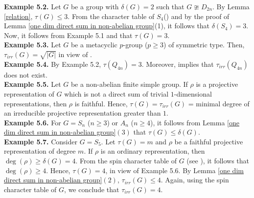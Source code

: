 \documentclass[a4paper,11pt]{amsart}
\numberwithin{equation}{section}
\numberwithin{equation}{subsection}
\newcommand{\dg}{\delta(G)}
\newcommand{\tg}{\tau(G)}
\begin{document}
\textbf{Example 5.2.} \label{tau(G) = 3}
Let $G$ be a group with $\dg= 2$ such that $G \ncong D_{2n}$. By Lemma \ref{relation}, $\tg \leq 3$. From the character table of $S_4$(\cite[18.1]{liebeck}) and by the proof of Lemma \ref{one dim direct sum in non-abelian group}(1), it follows that $\delta(S_4)=3$. Now,  it follows from Example 5.1 and \cite[Examples 2.2, 2.3 and 2.5]{kaur} that $\tg= 3$.  \\

\textbf{Example 5.3.} 
Let $G$ be a metacyclic $p$-group ($p \ge 3$) of symmetric type. Then, $\tau_{irr}(G)= \sqrt{|G|}$ in view of \cite[Chapter 10, Proof of Theorem 4.16]{karpilovsky}.  \\

\textbf{Example 5.4.}  \label{Q4n}
By Example 5.2, $\tau(Q_{4n})=3$. Moreover, \cite[Chapter 10, Theorem 4.14]{karpilovsky} implies that $\tau_{irr}(Q_{4n})$ does not exist.     \\

\textbf{Example 5.5.} \label{simple group}
Let $G$ be a non-abelian finite simple group.
If $\rho$ is a projective representation of $G$ which is not a direct sum of trivial $1$-dimensional representations, then $\rho$ is faithful. Hence, $\tau(G) = \tau_{irr}(G)$ = minimal degree of an irreducible projective representation greater than $1$.   \\

\textbf{Example 5.6.} \label{tau(G) leq delta(G)}
For $G=S_n$ ($n \geq 3$) or $A_n$ ($n\geq 4$), it follows from Lemma \ref{one dim direct sum in non-abelian group}$(3)$ that $\tau(G) \leq \delta(G)$. \\

\textbf{Example 5.7.} \label{S5}
Consider $G = S_5$. Let $\tau(G)= m$ and $\rho$ be a faithful projective representation of degree $m$. If $\rho$ is an ordinary representation, then $\deg(\rho) \geq \delta(G)= 4$. From the spin character table of $G$ (see \cite[Chapter 5, Theorem 6.8]{karpilovsky3}), it follows that $\deg(\rho) \geq 4$. Hence, $\tau(G) = 4$, in view of Example 5.6. By Lemma \ref{one dim direct sum in non-abelian group}$(2)$, $\tau_{irr}(G) \leq 4$. Again, using the spin character table of $G$, we conclude that $\tau_{irr}(G)= 4$.  \\
\end{document}
